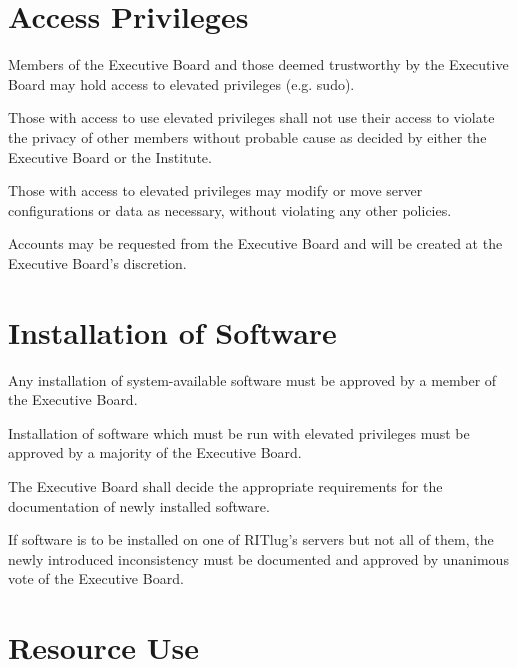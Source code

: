 



\section{Access Privileges}

\begin{subroutines}
\item Members of the Executive Board and those deemed trustworthy by the Executive Board may hold access to elevated privileges (e.g. sudo).
\item Those with access to use elevated privileges shall not use their access to violate the privacy of other members without probable cause as decided by either the Executive Board or the Institute.
\item Those with access to elevated privileges may modify or move server configurations or data as necessary, without violating any other policies.
\item Accounts may be requested from the Executive Board and will be created at the Executive Board's discretion.
\end{subroutines}

\section{Installation of Software}

\begin{subroutines}
\item Any installation of system-available software must be approved by a member of the Executive Board.
\item Installation of software which must be run with elevated privileges must be approved by a majority of the Executive Board.
\item The Executive Board shall decide the appropriate requirements for the documentation of newly installed software.
\item If software is to be installed on one of RITlug's servers but not all of them, the newly introduced inconsistency must be documented and approved by unanimous vote of the Executive Board.
\end{subroutines}

\section{Resource Use}

